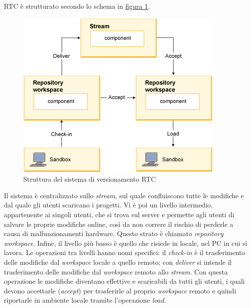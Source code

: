 RTC è strutturato secondo lo schema in \hyperref[fig:rtc-struttura]{figura \ref{fig:rtc-struttura}}.
\begin{figure}[H]
	\centering
	\includegraphics{Immagini/rtc-struttura.png}
	\caption{Struttura del sistema di versionamento RTC}
	\label{fig:rtc-struttura}
\end{figure}
Il sistema è centralizzato sullo \textit{stream}, sul quale confluiscono tutte le modifiche e dal quale gli utenti scaricano i progetti. Vi è poi un livello intermedio, appartenente ai singoli utenti, che si trova sul server e permette agli utenti di salvare le proprie modifiche online, così da non correre il rischio di perderle a causa di malfunzionamenti hardware. Questo strato è chiamato \textit{repository workspace}. Infine, il livello più basso è quello che risiede in locale, nel PC in cui si lavora. Le operazioni tra livelli hanno nomi specifici: il \textit{check-in} è il trasferimento delle modifiche dal \textit{workspace} locale a quello remoto; con \textit{deliver} si intende il trasferimento delle modifiche dal \textit{workspace} remoto allo \textit{stream}. Con questa operazione le modifiche diventano effettive e scaricabili da tutti gli utenti, i quali devono accettarle (\textit{accept}) per trasferirle al proprio \textit{workspace} remoto e quindi riportarle in ambiente locale tramite l'operazione \textit{load}.

